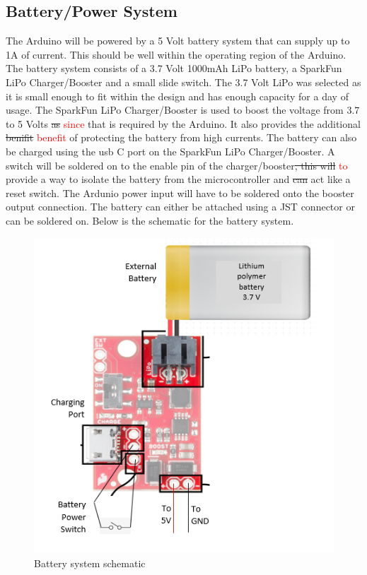\documentclass[12pt, titlepage]{article}
\begin{document}
\subsection{Battery/Power System}
The Arduino will be powered by a 5 Volt battery system that can supply up to 1A of current. This should be well within the operating region of the Arduino. The battery system consists of a 3.7 Volt 1000mAh  LiPo battery, a SparkFun LiPo Charger/Booster and a small slide switch. The 3.7 Volt LiPo was selected as it is small enough to fit within the design and has enough capacity for a day of usage. The SparkFun LiPo Charger/Booster is used to boost the voltage from 3.7 to 5 Volts \sout{as} \textcolor{red}{since} that is required by the Arduino. It also provides the additional \sout{benifit} \textcolor{red}{benefit} of protecting the battery from high currents. The battery can also be charged using the usb C port on the SparkFun LiPo Charger/Booster. A switch will be soldered on to the enable pin of the charger/booster\sout{, this will} \textcolor{red}{to} provide a way to isolate the battery from the microcontroller and \sout{can} act like a reset switch. The Ardunio power input will have to be soldered onto the booster output connection. The battery can either be attached using a JST connector or can be soldered on. Below is the schematic for the battery system.   
 \begin{figure}[H]
\centering
  \includegraphics[width=\textwidth,height=\textheight/2,keepaspectratio]{BatterySchematic.png}
  \caption{Battery system schematic}
  \label{batteryschematic} 
\end{figure}
\end{document}
